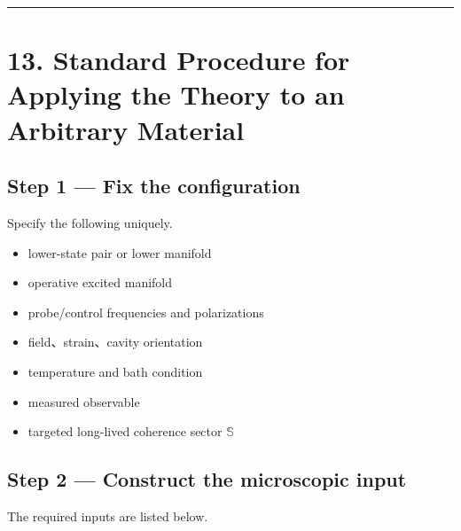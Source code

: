 \documentclass[
  10pt,
  a4paper,
]{article}
\providecommand{\tightlist}{%
  \setlength{\itemsep}{0pt}\setlength{\parskip}{0pt}}
\begin{document}
\begin{center}\rule{0.5\linewidth}{0.5pt}\end{center}

\section{13. Standard Procedure for Applying the Theory to an Arbitrary
Material}\label{standard-procedure-for-applying-the-theory-to-an-arbitrary-material}

\subsection{Step 1 --- Fix the
configuration}\label{step-1-fix-the-configuration}

Specify the following uniquely.

\begin{itemize}
\tightlist
\item
  lower-state pair or lower manifold
\item
  operative excited manifold
\item
  probe/control frequencies and polarizations
\item
  field、strain、cavity orientation
\item
  temperature and bath condition
\item
  measured observable
\item
  targeted long-lived coherence sector \(\mathbb S\)
\end{itemize}

\subsection{Step 2 --- Construct the microscopic
input}\label{step-2-construct-the-microscopic-input}

The required inputs are listed below.
\end{document}
